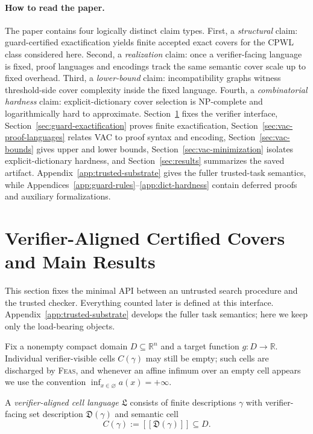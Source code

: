 \documentclass{article}
\begin{document}
\paragraph{How to read the paper.}
The paper contains four logically distinct claim types. First, a \emph{structural} claim: guard-certified exactification yields finite accepted exact covers for the CPWL class considered here. Second, a \emph{realization} claim: once a verifier-facing language is fixed, proof languages and encodings track the same semantic cover scale up to fixed overhead. Third, a \emph{lower-bound} claim: incompatibility graphs witness threshold-side cover complexity inside the fixed language. Fourth, a \emph{combinatorial hardness} claim: explicit-dictionary cover selection is NP-complete and logarithmically hard to approximate. Section~\ref{sec:verifier-model} fixes the verifier interface, Section~\ref{sec:guard-exactification} proves finite exactification, Section~\ref{sec:vac-proof-languages} relates VAC to proof syntax and encoding, Section~\ref{sec:vac-bounds} gives upper and lower bounds, Section~\ref{sec:vac-minimization} isolates explicit-dictionary hardness, and Section~\ref{sec:results} summarizes the saved artifact. Appendix~\ref{app:trusted-substrate} gives the fuller trusted-task semantics, while Appendices~\ref{app:guard-rules}--\ref{app:dict-hardness} contain deferred proofs and auxiliary formalizations.

\section{Verifier-Aligned Certified Covers and Main Results}\label{sec:verifier-model}

This section fixes the minimal API between an untrusted search procedure and the trusted checker. Everything counted later is defined at this interface. Appendix~\ref{app:trusted-substrate} develops the fuller task semantics; here we keep only the load-bearing objects.

Fix a nonempty compact domain $D\subseteq\mathbb R^n$ and a target function $g:D\to\mathbb R$. Individual verifier-visible cells $C(\gamma)$ may still be empty; such cells are discharged by \textsc{Feas}, and whenever an affine infimum over an empty cell appears we use the convention $\inf_{x\in\varnothing} a(x)=+\infty$.

A \emph{verifier-aligned cell language} $\mathfrak L$ consists of finite descriptions $\gamma$ with verifier-facing set description $\mathfrak D(\gamma)$ and semantic cell
\[
C(\gamma):=[\![\mathfrak D(\gamma)]\!]\subseteq D.
\]
\end{document}

